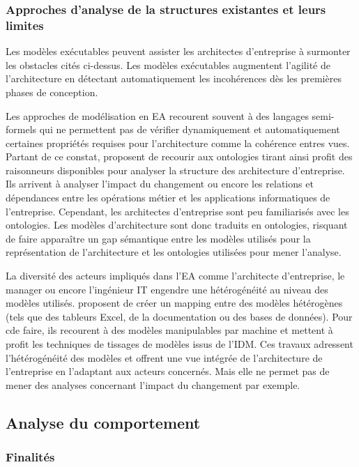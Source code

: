 \subsubsection{Approches d'analyse de la structures existantes et leurs limites}
	
Les modèles exécutables peuvent assister les architectes d'entreprise à
surmonter les obstacles cités ci-dessus. Les modèles exécutables augmentent
l'agilité de l'architecture en détectant automatiquement les incohérences dès
les premières phases de conception. 
	
Les approches de modélisation en EA recourent souvent à des langages
semi-formels qui ne permettent pas de vérifier dynamiquement et automatiquement
certaines propriétés requises pour l'architecture comme la cohérence entres
vues. Partant de ce constat, \cite{sunkle_analyzing_2013} proposent de recourir
aux ontologies tirant ainsi profit des raisonneurs disponibles pour analyser la
structure des architecture d'entreprise. Ils arrivent à analyser l'impact du
changement ou encore les relations et dépendances entre les opérations métier
et les applications informatiques de l'entreprise. Cependant, les architectes
d'entreprise sont peu familiarisés avec les ontologies. Les modèles
d'architecture sont donc traduits en ontologies, risquant de faire
apparaître un gap sémantique entre les modèles utilisés pour la représentation
de l'architecture et les ontologies utilisées pour mener l'analyse.
	
La diversité des acteurs impliqués dans l'EA comme l'architecte d'entreprise,
le manager ou encore l'ingénieur IT engendre une hétérogénéité au niveau des
modèles utilisés. \cite{bruneliere2013support} proposent de créer un mapping
entre des modèles hétérogènes (tels que des tableurs Excel, de la documentation
ou des bases de données). Pour cde faire, ils recourent à des modèles manipulables par machine et mettent à profit les techniques de tissages de modèles issus de l'IDM. Ces
travaux adressent l'hétérogénéité des modèles et offrent une vue intégrée
de l'architecture de l'entreprise en l'adaptant aux acteurs concernés. Mais elle ne permet pas de mener des analyses concernant l'impact du changement par exemple. 

	
\subsection{Analyse du comportement}

\subsubsection{Finalités}

